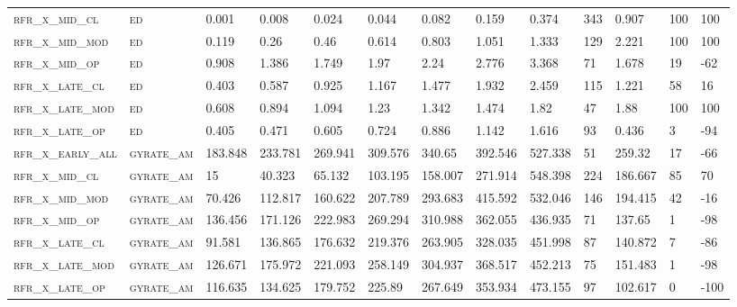 \begin{landscape}
\begin{center}
\begin{footnotesize}
\begin{longtable}{lllllllllllll}
\textsc{rfr\_x\_mid\_cl   } & \textsc{ed        }   & 0.001   & 0.008   & 0.024    & 0.044    & 0.082    & 0.159    & 0.374    & 343  & 0.907   & 100 & 100   \\
\textsc{rfr\_x\_mid\_mod  } & \textsc{ed        }   & 0.119   & 0.26    & 0.46     & 0.614    & 0.803    & 1.051    & 1.333    & 129  & 2.221   & 100 & 100   \\
\textsc{rfr\_x\_mid\_op   } & \textsc{ed        }   & 0.908   & 1.386   & 1.749    & 1.97     & 2.24     & 2.776    & 3.368    & 71   & 1.678   & 19  & -62   \\
\textsc{rfr\_x\_late\_cl  } & \textsc{ed        }   & 0.403   & 0.587   & 0.925    & 1.167    & 1.477    & 1.932    & 2.459    & 115  & 1.221   & 58  & 16    \\
\textsc{rfr\_x\_late\_mod } & \textsc{ed        }   & 0.608   & 0.894   & 1.094    & 1.23     & 1.342    & 1.474    & 1.82     & 47   & 1.88    & 100 & 100   \\
\textsc{rfr\_x\_late\_op  } & \textsc{ed        }   & 0.405   & 0.471   & 0.605    & 0.724    & 0.886    & 1.142    & 1.616    & 93   & 0.436   & 3   & -94   \\
\textsc{rfr\_x\_early\_all} & \textsc{gyrate\_am}   & 183.848 & 233.781 & 269.941  & 309.576  & 340.65   & 392.546  & 527.338  & 51   & 259.32  & 17  & -66   \\
\textsc{rfr\_x\_mid\_cl   } & \textsc{gyrate\_am}   & 15      & 40.323  & 65.132   & 103.195  & 158.007  & 271.914  & 548.398  & 224  & 186.667 & 85  & 70    \\
\textsc{rfr\_x\_mid\_mod  } & \textsc{gyrate\_am}   & 70.426  & 112.817 & 160.622  & 207.789  & 293.683  & 415.592  & 532.046  & 146  & 194.415 & 42  & -16   \\
\textsc{rfr\_x\_mid\_op   } & \textsc{gyrate\_am}   & 136.456 & 171.126 & 222.983  & 269.294  & 310.988  & 362.055  & 436.935  & 71   & 137.65  & 1   & -98   \\
\textsc{rfr\_x\_late\_cl  } & \textsc{gyrate\_am}   & 91.581  & 136.865 & 176.632  & 219.376  & 263.905  & 328.035  & 451.998  & 87   & 140.872 & 7   & -86   \\
\textsc{rfr\_x\_late\_mod } & \textsc{gyrate\_am}   & 126.671 & 175.972 & 221.093  & 258.149  & 304.937  & 368.517  & 452.213  & 75   & 151.483 & 1   & -98   \\
\textsc{rfr\_x\_late\_op  } & \textsc{gyrate\_am}   & 116.635 & 134.625 & 179.752  & 225.89   & 267.649  & 353.934  & 473.155  & 97   & 102.617 & 0   & -100  \\

\end{longtable}
\end{footnotesize}
\end{center}
\end{landscape}
